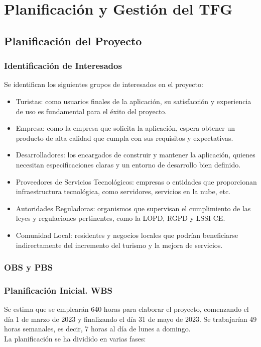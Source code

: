 \chapter{Planificación y Gestión del TFG}
\section{Planificación del Proyecto}
\subsection{Identificación de Interesados}
Se identifican los siguientes grupos de interesados en el proyecto:
\begin{itemize}
	\item Turistas: como usuarios finales de la aplicación, su satisfacción y experiencia de uso es fundamental para el éxito del proyecto.
	\item Empresa: como la empresa que solicita la aplicación, espera obtener un producto de alta calidad que cumpla con sus requisitos y expectativas.
	\item Desarrolladores: los encargados de construir y mantener la aplicación, quienes necesitan especificaciones claras y un entorno de desarrollo bien definido.
	\item Proveedores de Servicios Tecnológicos: empresas o entidades que proporcionan infraestructura tecnológica, como servidores, servicios en la nube, etc.
	\item Autoridades Reguladoras: organismos que supervisan el cumplimiento de las leyes y regulaciones pertinentes, como la LOPD, RGPD y LSSI-CE.
	\item Comunidad Local: residentes y negocios locales que podrían beneficiarse indirectamente del incremento del turismo y la mejora de servicios.
\end{itemize}
\subsection{OBS y PBS}


\subsection{Planificación Inicial. WBS}
Se estima que se emplearán 640 horas para elaborar el proyecto, comenzando el día 1 de marzo de 2023 y finalizando el día 31 de mayo de 2023. Se trabajarían 49 horas semanales, es decir, 7 horas al día de lunes a domingo.\\[1ex]
La planificación se ha dividido en varias fases:

